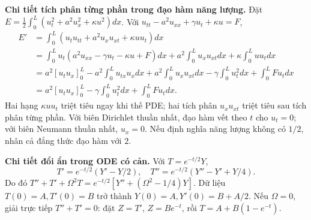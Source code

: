 \documentclass[10pt,a4paper]{article}
\begin{document}
\textbf{Chi tiết tích phân từng phần trong đạo hàm năng lượng.} Đặt $E=\frac12\int_0^L(u_t^2+a^2u_x^2+\kappa u^2)dx$. Với $u_{tt}-a^2u_{xx}+\gamma u_t+\kappa u=F$,
\[\begin{aligned}
E'&=\int_0^L(u_tu_{tt}+a^2u_xu_{xt}+\kappa uu_t)dx\\
&=\int_0^Lu_t(a^2u_{xx}-\gamma u_t-\kappa u+F)dx
+a^2\int_0^Lu_xu_{xt}dx+\kappa\int_0^Luu_tdx\\
&=a^2[u_tu_x]_0^L-a^2\int_0^Lu_{tx}u_xdx
+a^2\int_0^Lu_xu_{xt}dx-\gamma\int_0^Lu_t^2dx+\int_0^LFu_tdx\\
&=a^2[u_tu_x]_0^L-\gamma\int_0^Lu_t^2dx+\int_0^LFu_tdx.
\end{aligned}\]
Hai hạng $\kappa uu_t$ triệt tiêu ngay khi thế PDE; hai tích phân $u_xu_{xt}$ triệt tiêu sau tích phân từng phần. Với biên Dirichlet thuần nhất, đạo hàm vết theo $t$ cho $u_t=0$; với biên Neumann thuần nhất, $u_x=0$. Nếu định nghĩa năng lượng không có $1/2$, nhân cả đẳng thức đạo hàm với $2$.

\textbf{Chi tiết đổi ẩn trong ODE có cản.} Với $T=e^{-t/2}Y$,
\[T'=e^{-t/2}(Y'-Y/2),\quad T''=e^{-t/2}(Y''-Y'+Y/4).\]
Do đó $T''+T'+\Omega^2T=e^{-t/2}[Y''+(\Omega^2-1/4)Y]$. Dữ liệu $T(0)=A,T'(0)=B$ trở thành $Y(0)=A,Y'(0)=B+A/2$. Nếu $\Omega=0$, giải trực tiếp $T''+T'=0$: đặt $Z=T'$, $Z=Be^{-t}$, rồi $T=A+B(1-e^{-t})$.
\end{document}
